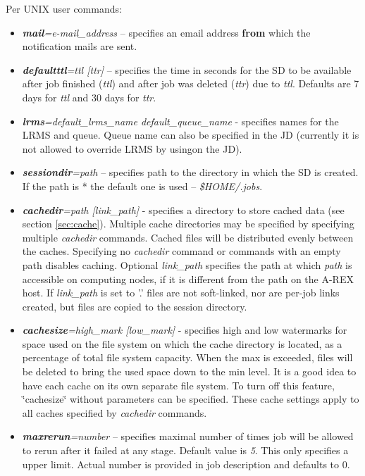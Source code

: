 \documentclass{article}                            %
\begin{document}
Per UNIX user commands:

\begin{itemize}
\item \textbf{\textit{mail}}\textit{=e-mail\_address} -- specifies an email
address \textbf{from} which the notification mails are sent.
\item \textbf{\textit{defaultttl}}\textit{=ttl {[}ttr]} -- specifies the
time in seconds for the SD to be available after job finished (\emph{ttl})
and after job was deleted (\emph{ttr}) due to \emph{ttl}. Defaults
are 7 days for \emph{ttl} and 30 days for \emph{ttr}.
\item \textbf{\textit{lrms}}\textit{=default\_lrms\_name default\_queue\_name}
- specifies names for the LRMS and queue. Queue name can also be specified
in the JD (currently it is not allowed to override LRMS by usingon
the JD).
\item \textbf{\textit{sessiondir}}\textit{=path} -- specifies path to the directory
in which the SD is created. If the path is {*} the default one is
used -- \textit{\$HOME/.jobs}.
\item \textbf{\textit{cachedir}}\textit{=path {[}link\_path]} - specifies
a directory to store cached data (see section \ref{sec:cache}). Multiple
cache directories may be specified by specifying multiple \emph{cachedir}
commands. Cached files will be distributed evenly between the caches.
Specifying no \emph{cachedir }command or commands with an empty path
disables caching. Optional \textit{link\_path} specifies the path
at which \emph{path} is accessible on computing nodes, if it is different
from the path on the A-REX host. If \textit{link\_path} is set to '.'
files are not soft-linked, nor are per-job links created, but files
are copied to the session directory.
\item \textbf{\textit{cachesize}}\textit{=high\_mark {[}low\_mark]} -
  specifies high and low watermarks for space used on the file system
  on which the cache directory is located, as a percentage of total
  file system capacity. When the max is exceeded, files will be
  deleted to bring the used space down to the min level. It is a good
  idea to have each cache on its own separate file system. To turn off
  this feature, \char`\"{}cachesize\char`\"{} without parameters can
  be specified. These cache settings apply to all caches specified by
  \emph{cachedir} commands.
\item \textbf{\textit{maxrerun}}\textit{=number} -- specifies maximal number
of times job will be allowed to rerun after it failed at any stage.
Default value is \emph{5}. This only specifies a upper limit. Actual
number is provided in job description and defaults to 0.
\end{itemize}
\end{document}
